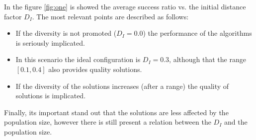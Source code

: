 In the figure \ref{fig:one} is showed the average success ratio vs. the initial distance factor $D_I$.
%
The most relevant points are described as follows:
\begin{itemize}
\item If the diversity is not promoted ($D_I = 0.0 $) the performance of the algorithms is seriously implicated.
\item In this scenario the ideal configuration is $D_I=0.3$, although that the range $[0.1, 0.4]$ also provides quality solutions.
\item If the diversity of the solutions increases (after a range) the quality of solutions is implicated.
\end{itemize}
Finally, its important stand out that the solutions are less affected by the population size, however there is still present a relation between the $D_I$ and the population size.
%

